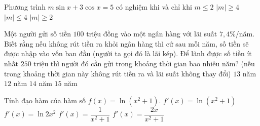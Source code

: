 \begin{ex}%
Phương trình $ m\sin x+3\cos x=5 $ có nghiệm khi và chỉ khi
\choice
{$ m\le 2 $}
{\True $ |m|\ge 4 $}
{$ |m|\le 4 $}
{$ |m|\ge 2 $}
\end{ex}
\begin{ex}%
Một người gửi số tiền $ 100 $ triệu đồng vào một ngân hàng với lãi suất $ 7,4 $\%/năm. Biết rằng
nếu không rút tiền ra khỏi ngân hàng thì cứ sau mỗi năm, số tiền sẽ được nhập vào vốn ban đầu
(người ta gọi đó là lãi kép). Để lãnh được số tiền ít nhất $ 250 $ triệu thì người đó cần gửi trong khoảng
thời gian bao nhiêu năm? (nếu trong khoảng thời gian này không rút tiền ra và lãi suất không thay
đổi)
\choice
{\True $ 13 $ năm }
{$ 12 $ năm }
{$ 14 $ năm }
{$ 15 $ năm }
\end{ex}
\begin{ex}%
Tính đạo hàm của hàm số $ f(x)=\ln(x^2+1). $
\choice
{$ f'(x)=\ln(x^2+1) $}
{$ f'(x)=\ln2x^2 $}
{$ f'(x)=\dfrac{1}{x^2+1} $}
{\True $ f'(x)=\dfrac{2x}{x^2+1} $}
\end{ex}
